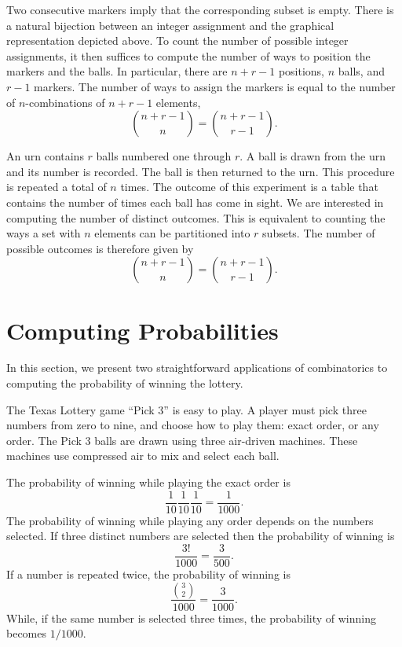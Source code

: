 Two consecutive markers imply that the corresponding subset is empty.
There is a natural bijection between an integer assignment and the graphical representation depicted above.
To count the number of possible integer assignments, it then suffices to compute the number of ways to position the markers and the balls.
In particular, there are $n + r - 1$ positions, $n$ balls, and $r - 1$ markers.
The number of ways to assign the markers is equal to the number of $n$-combinations of $n + r - 1$ elements,
\begin{equation*}
\binom{n + r - 1}{n} = \binom{n + r - 1}{r - 1} .
\end{equation*}

\begin{example}
An urn contains $r$ balls numbered one through $r$.
A ball is drawn from the urn and its number is recorded.
The ball is then returned to the urn.
This procedure is repeated a total of $n$ times.
The outcome of this experiment is a table that contains the number of times each ball has come in sight.
We are interested in computing the number of distinct outcomes.
This is equivalent to counting the ways a set with $n$ elements can be partitioned into $r$ subsets.
The number of possible outcomes is therefore given by
\begin{equation*}
\binom{n + r - 1}{n} = \binom{n + r - 1}{r - 1} .
\end{equation*}
\end{example}


\section{Computing Probabilities}

In this section, we present two straightforward applications of combinatorics to computing the probability of winning the lottery.

\begin{example}
The Texas Lottery game ``Pick $3$'' is easy to play.
A player must pick three numbers from zero to nine, and choose how to play them: exact order, or any order.
The Pick $3$ balls are drawn using three air-driven machines.
These machines use compressed air to mix and select each ball.

The probability of winning while playing the exact order is
\begin{equation*}
\frac{1}{10} \frac{1}{10} \frac{1}{10}
= \frac{1}{1000} .
\end{equation*}
The probability of winning while playing any order depends on the numbers selected.
If three distinct numbers are selected then the probability of winning is
\begin{equation*}
\frac{3!}{1000} = \frac{3}{500} .
\end{equation*}
If a number is repeated twice, the probability of winning is
\begin{equation*}
\frac{\binom{3}{2}}{1000} = \frac{3}{1000} .
\end{equation*}
While, if the same number is selected three times, the probability of winning becomes $1/1000$.
\end{example}

